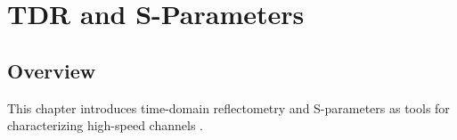 \chapter{TDR and S-Parameters}

\section{Overview}

This chapter introduces time-domain reflectometry and
S-parameters as tools for characterizing high-speed channels
\citep{palermo2025ecen720}.






